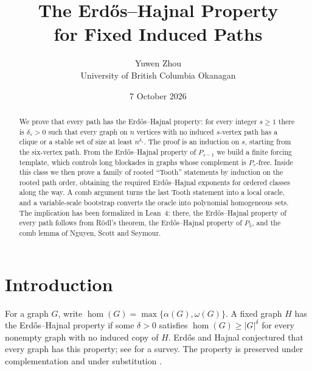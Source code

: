 \documentclass[11pt,a4paper]{article}
\theoremstyle{definition}
\theoremstyle{remark}
\numberwithin{equation}{section}
\begin{document}
\title{The Erd\H{o}s--Hajnal Property\\for Fixed Induced Paths}
\author{Yuwen Zhou\\[2pt]\small University of British Columbia Okanagan}
\date{7 October 2026}
\maketitle
\begin{abstract}
We prove that every path has the Erd\H{o}s--Hajnal property: for every integer \(s\ge1\) there is \(\delta_s>0\) such that every graph on \(n\) vertices with no induced \(s\)-vertex path has a clique or a stable set of size at least \(n^{\delta_s}\). The proof is an induction on \(s\), starting from the six-vertex path. From the Erd\H{o}s--Hajnal property of \(P_{s-1}\) we build a finite forcing template, which controls long blockades in graphs whose complement is \(P_s\)-free. Inside this class we then prove a family of rooted ``Tooth'' statements by induction on the rooted path order, obtaining the required Erd\H{o}s--Hajnal exponents for ordered classes along the way. A comb argument turns the last Tooth statement into a local oracle, and a variable-scale bootstrap converts the oracle into polynomial homogeneous sets. The implication has been formalized in Lean~4: there, the Erd\H{o}s--Hajnal property of every path follows from R\"odl's theorem, the Erd\H{o}s--Hajnal property of \(P_5\), and the comb lemma of Nguyen, Scott and Seymour.
\end{abstract}
\tableofcontents
\clearpage
\section{Introduction}\label{sec:intro}
For a graph \(G\), write \(\hom(G)=\max\{\alpha(G),\omega(G)\}\). A fixed graph \(H\) has the Erd\H{o}s--Hajnal property if some \(\delta>0\) satisfies \(\hom(G)\ge |G|^\delta\) for every nonempty graph with no induced copy of \(H\). Erd\H{o}s and Hajnal \cite{eh} conjectured that every graph has this property; see \cite{chudnovsky} for a survey. The property is preserved under complementation and under substitution \cite{aps}.
\end{document}
